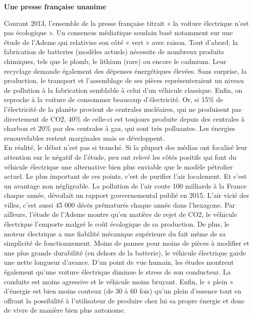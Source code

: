 \documentclass[8pt]{article}
\begin{document}
\textbf{Une presse française unanime}

Courant 2013, l’ensemble de la presse française titrait « la voiture électrique n’est pas écologique ». Un consensus médiatique soudain basé notamment sur une étude de l’Ademe qui relativise son côté « vert » avec raison. Tout d’abord, la fabrication de batteries (modèles actuels) nécessite de nombreux produits chimiques, tels que le plomb, le lithium (rare) ou encore le cadmium. Leur recyclage demande également des dépenses énergétiques élevées. Sans surprise, la production, le transport et l’assemblage de ses pièces représenteraient un niveau de pollution à la fabrication semblable à celui d’un véhicule classique. Enfin, on reproche à la voiture de consommer beaucoup d’électricité. Or, si 15\% de l’électricité de la planète provient de centrales nucléaires, qui ne produisent pas directement de CO2, 40\% de celle-ci est toujours produite depuis des centrales à charbon et 20\% par des centrales à gaz, qui sont très polluantes. Les énergies renouvelables restent marginales mais se développent. \\

En réalité, le débat n’est pas si tranché. Si la plupart des médias ont focalisé leur attention sur le négatif de l’étude, peu ont relevé les côtés positifs qui font du véhicule électrique une alternative bien plus enviable que le modèle pétrolier actuel. Le plus important de ces points, c’est de purifier l’air localement. Et c’est un avantage non négligeable. La pollution de l’air coute 100 milliards à la France chaque année, dévoilait un rapport gouvernemental publié en 2015. L’air vicié des villes, c’est aussi 45 000 décès prématurés chaque année dans l’hexagone. Par ailleurs, l’étude de l’Ademe montre qu’en matière de rejet de CO2, le véhicule électrique l’emporte malgré le coût écologique de sa production. De plus, le moteur électrique a une fiabilité mécanique supérieure du fait même de sa simplicité de fonctionnement. Moins de pannes pour moins de pièces à modifier et une plus grande durabilité (en dehors de la batterie), le véhicule électrique garde une nette longueur d’avance. D’un point de vue humain, les études montrent également qu’une voiture électrique diminue le stress de son conducteur. La conduite est moins agressive et le véhicule moins bruyant. Enfin, le « plein » d’énergie est bien moins couteux (de 30 à 60 fois) qu’un plein d’essence tout en offrant la possibilité à l’utilisateur de produire chez lui sa propre énergie et donc de vivre de manière bien plus autonome. \\
\end{document}
